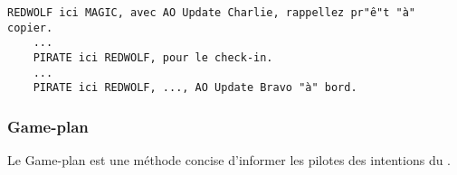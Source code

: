 \begin{e1}
\begin{e2}
		
		\begin{minipage}{\linewidth}
			\begin{lstlisting}[caption=AO Update: code, label=aoupdatecode]
	REDWOLF ici MAGIC, avec AO Update Charlie, rappellez pr"ê"t "à" copier.
	...
	PIRATE ici REDWOLF, pour le check-in.
	...
	PIRATE ici REDWOLF, ..., AO Update Bravo "à" bord.
			\end{lstlisting}
		\end{minipage}
		
	\end{e2}
	
\end{e1}
	


\subsubsection{Game-plan}%

Le Game-plan est une méthode concise d'informer les pilotes des intentions du \ja{}.


